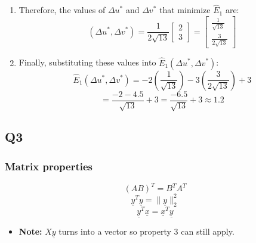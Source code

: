 \begin{example}
\begin{enumerate}
        \item Therefore, the values of \( \Delta u^* \) and \( \Delta v^* \) that minimize \( \hat{E}_1 \) are:
        \[
        \left( \Delta u^*, \Delta v^* \right) = \frac{1}{2\sqrt{13}} \begin{bmatrix} 2 \\ 3 \end{bmatrix} = \begin{bmatrix} \frac{1}{\sqrt{13}} \\ \frac{3}{2\sqrt{13}} \end{bmatrix}
        \]
    
        \item Finally, substituting these values into \( \hat{E}_1(\Delta u^*, \Delta v^*) \):
        \[
        \hat{E}_1(\Delta u^*, \Delta v^*) = -2 \left( \frac{1}{\sqrt{13}} \right) - 3 \left( \frac{3}{2\sqrt{13}} \right) + 3
        \]
        \[
        = \frac{-2 - 4.5}{\sqrt{13}} + 3 = \frac{-6.5}{\sqrt{13}} + 3 \approx 1.2
        \]
    \end{enumerate}    
\end{example}

\subsection{Q3}
\subsubsection{Matrix properties}
\begin{definition}
    \begin{equation}
        (AB)^T = B^T A^T 
    \end{equation}
    \begin{equation}
        \underline{y}^T \underline{y} = \| \underline{y} \|_2^2
    \end{equation}
    \begin{equation}
        \underline{y}^T \underline{x} = \underline{x}^T \underline{y}
    \end{equation}
    \begin{itemize}
        \item \textbf{Note:} $X \underline{y}$ turns into a vector so property 3 can still apply.
    \end{itemize}
\end{definition}

